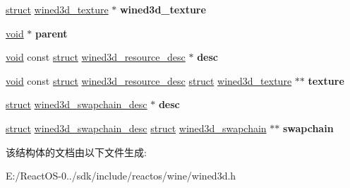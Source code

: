 \begin{DoxyCompactItemize}
\hyperlink{interfacestruct}{struct} \hyperlink{structwined3d__texture}{wined3d\+\_\+texture} $\ast$ {\bfseries wined3d\+\_\+texture}
\item 
\mbox{\label{structwined3d__device__parent__ops_ae497c8d546181d35dcc376cfca217188}} 
\hyperlink{interfacevoid}{void} $\ast$ {\bfseries parent}
\item 
\mbox{\label{structwined3d__device__parent__ops_a9cd8b209a72d014a8a59b7e302fcf9e7}} 
\hyperlink{interfacevoid}{void} const \hyperlink{interfacestruct}{struct} \hyperlink{structwined3d__resource__desc}{wined3d\+\_\+resource\+\_\+desc} $\ast$ {\bfseries desc}
\item 
\mbox{\label{structwined3d__device__parent__ops_af1694bd725fe87b82224f33e88ea5bd1}} 
\hyperlink{interfacevoid}{void} const \hyperlink{interfacestruct}{struct} \hyperlink{structwined3d__resource__desc}{wined3d\+\_\+resource\+\_\+desc} \hyperlink{interfacestruct}{struct} \hyperlink{structwined3d__texture}{wined3d\+\_\+texture} $\ast$$\ast$ {\bfseries texture}
\item 
\mbox{\label{structwined3d__device__parent__ops_a1632fcb877f66943d6047c2ee579234f}} 
\hyperlink{interfacestruct}{struct} \hyperlink{structwined3d__swapchain__desc}{wined3d\+\_\+swapchain\+\_\+desc} $\ast$ {\bfseries desc}
\item 
\mbox{\label{structwined3d__device__parent__ops_a890b1f71103bc51f87b9745f484d9024}} 
\hyperlink{interfacestruct}{struct} \hyperlink{structwined3d__swapchain__desc}{wined3d\+\_\+swapchain\+\_\+desc} \hyperlink{interfacestruct}{struct} \hyperlink{structwined3d__swapchain}{wined3d\+\_\+swapchain} $\ast$$\ast$ {\bfseries swapchain}
\end{DoxyCompactItemize}


该结构体的文档由以下文件生成\+:\begin{DoxyCompactItemize}
\item 
E\+:/\+React\+O\+S-\/0../sdk/include/reactos/wine/wined3d.\+h\end{DoxyCompactItemize}
